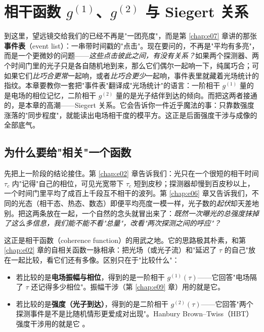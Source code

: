 \chapter{\texorpdfstring{相干函数 $g^{(1)}$、$g^{(2)}$ 与 Siegert 关系}{相干函数 g1、g2 与 Siegert 关系}}
\label{chap:e08}

\begin{chapteropening}
到这里，望远镜交给我们的已经不再是"一团亮度"，而是第 \ref{chap:e07} 章讲的那张\textbf{事件表}（event list）：一串带时间戳的"点击"。现在要问的，不再是"平均有多亮"，而是一个更微妙的问题——\emph{这些点击彼此之间，有没有关系？}如果两个探测器、两个时间门里的光子只是各自随机地到来，那么它们偶尔一起响一下，纯属巧合；可如果它们\emph{比巧合更常}一起响，或者\emph{比巧合更少}一起响，事件表里就藏着光场统计的指纹。本章要教你一套把"事件表"翻译成"光场统计"的语言：一阶相干 \(g^{(1)}\) 量的是电场的相位记忆，二阶相干 \(g^{(2)}\) 量的是光子结伴到达的倾向。而把这两者接通的，是本章的高潮——Siegert 关系。它会告诉你一件近乎魔法的事：只靠数强度涨落的"同步程度"，就能读出电场相干度的模平方。这正是后面强度干涉与成像的全部底气。
\end{chapteropening}

\section{为什么要给"相关"一个函数}
\label{sec:e08-why-correlation}

先把上一阶段的结论接住。第 \ref{chap:e02} 章告诉我们：光只在一个很短的相干时间 \(\tau_c\) 内"记得"自己的相位，可见光宽带下 \(\tau_c\) 短到皮秒；探测器却慢到百皮秒以上，一个时间门里平均了成百上千段互不相干的波列。第 \ref{chap:e06} 章又告诉我们，不同的光态（相干态、热态、数态）即便平均亮度一模一样，光子数的\emph{起伏}却天差地别。把这两条放在一起，一个自然的念头就冒出来了：\emph{既然一次曝光的总强度抹掉了这么多信息，我们能不能不看"总量"，改看"两次探测之间的呼应"？}

这正是相干函数（coherence function）的用武之地。它的思路极其朴素，和第 \ref{chap:e02} 章的自相关函数一脉相承：把光场（或光子流）和"延迟了 \(\tau\) 的自己"放在一起比较，看它们还有多像。区别只在于"比较什么"：

\begin{itemize}
  \item 若比较的是\textbf{电场振幅与相位}，得到的是一阶相干 \(g^{(1)}(\tau)\)——它回答"电场隔了 \(\tau\) 还记得多少相位"。振幅干涉（第 \ref{chap:e09} 章）用的就是它。
  \item 若比较的是\textbf{强度（光子到达）}，得到的是二阶相干 \(g^{(2)}(\tau)\)——它回答"两个探测事件是不是比随机情形更爱成对出现"。Hanbury Brown--Twiss（HBT）强度干涉用的就是它 \citep{1956Natur.177...27B}。
\end{itemize}

